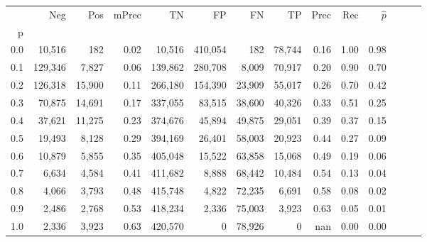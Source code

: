 \begin{tabular}{rrrrrrrrrrrrrr}
\toprule
{} &      Neg &     Pos & mPrec &       TN &       FP &      FN &      TP &  Prec &   Rec & $\hat{p}$ \\
p   &          &         &       &          &          &         &         &       &       &           \\
\midrule
0.0 &   10,516 &     182 &  0.02 &   10,516 &  410,054 &     182 &  78,744 &  0.16 &  1.00 &      0.98 \\
0.1 &  129,346 &   7,827 &  0.06 &  139,862 &  280,708 &   8,009 &  70,917 &  0.20 &  0.90 &      0.70 \\
0.2 &  126,318 &  15,900 &  0.11 &  266,180 &  154,390 &  23,909 &  55,017 &  0.26 &  0.70 &      0.42 \\
0.3 &   70,875 &  14,691 &  0.17 &  337,055 &   83,515 &  38,600 &  40,326 &  0.33 &  0.51 &      0.25 \\
0.4 &   37,621 &  11,275 &  0.23 &  374,676 &   45,894 &  49,875 &  29,051 &  0.39 &  0.37 &      0.15 \\
0.5 &   19,493 &   8,128 &  0.29 &  394,169 &   26,401 &  58,003 &  20,923 &  0.44 &  0.27 &      0.09 \\
0.6 &   10,879 &   5,855 &  0.35 &  405,048 &   15,522 &  63,858 &  15,068 &  0.49 &  0.19 &      0.06 \\
0.7 &    6,634 &   4,584 &  0.41 &  411,682 &    8,888 &  68,442 &  10,484 &  0.54 &  0.13 &      0.04 \\
0.8 &    4,066 &   3,793 &  0.48 &  415,748 &    4,822 &  72,235 &   6,691 &  0.58 &  0.08 &      0.02 \\
0.9 &    2,486 &   2,768 &  0.53 &  418,234 &    2,336 &  75,003 &   3,923 &  0.63 &  0.05 &      0.01 \\
1.0 &    2,336 &   3,923 &  0.63 &  420,570 &        0 &  78,926 &       0 &   nan &  0.00 &      0.00 \\
\bottomrule
\end{tabular}

